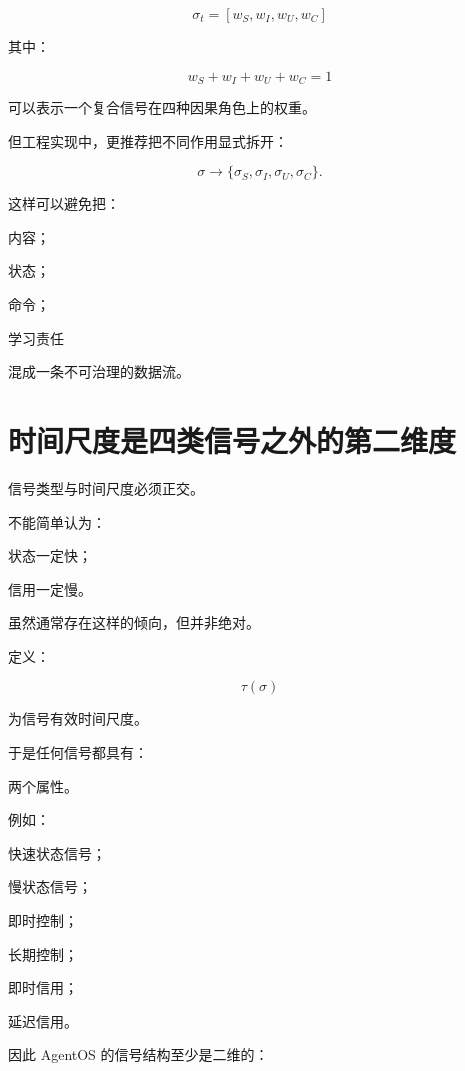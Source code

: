 \[
\boxed{
\sigma_t
=
[
w_S,
w_I,
w_U,
w_C
]
}
\]

其中：

\[
w_S+w_I+w_U+w_C=1
\]

可以表示一个复合信号在四种因果角色上的权重。

但工程实现中，更推荐把不同作用显式拆开：

\[
\sigma
\rightarrow
\{
\sigma_S,
\sigma_I,
\sigma_U,
\sigma_C
\}.
\]

这样可以避免把：

内容；

状态；

命令；

学习责任

混成一条不可治理的数据流。

\section{时间尺度是四类信号之外的第二维度}

信号类型与时间尺度必须正交。

不能简单认为：

状态一定快；

信用一定慢。

虽然通常存在这样的倾向，但并非绝对。

定义：

\[
\tau(\sigma)
\]

为信号有效时间尺度。

于是任何信号都具有：

\begin{statementbox}
\centering
{}
\end{statementbox}

两个属性。

例如：

快速状态信号；

慢状态信号；

即时控制；

长期控制；

即时信用；

延迟信用。

因此 AgentOS 的信号结构至少是二维的：

\begin{statementbox}
\centering
{}
\end{statementbox}

